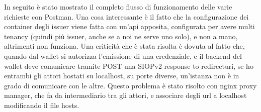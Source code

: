 In seguito è stato mostrato il completo flusso di funzionamento delle varie richieste con Postman\glo. Una cosa interessante è il fatto che la configurazione dei container degli issuer viene fatta con un'api apposita, configurata per avere multi tenancy (quindi più issuer, anche se a noi ne serve uno solo), e non a mano, altrimenti non funziona.
Una criticità che è stata risolta è dovuta al fatto che, quando dal wallet si autorizza l'emissione di una credenziale, e il backend del wallet deve comunicare tramite POST una SIOPv2 response to redirecturi, se ho entrambi gli attori hostati su localhost, su porte diverse, un'istanza non è in grado di comunicare con le altre.
Questo problema è stato risolto con nginx proxy manager, che fa da intermediario tra gli attori, e associare degli url a localhost modificando il file hosts.